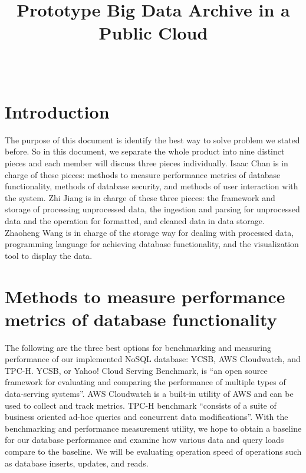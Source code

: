 \documentclass[10pt,draftclsnofoot,onecolumn,journal,compsoc]{IEEEtran}
\title{Prototype Big Data Archive in a Public Cloud}
\author{
  \IEEEauthorblockN{Group 56: Pathfinder of Big Data\\Zhi Jiang, Isaac T Chan, Zhaoheng Wang} \\
  \IEEEauthorblockA{CS 461: Senior Capstone Fall 2016 \\ Oregon State University}
}
\date{}
\begin{document}
    \maketitle
    \IEEEdisplaynontitleabstractindextext
    \IEEEpeerreviewmaketitle

    \newpage
    \tableofcontents
    \newpage
        \section{Introduction}
        The purpose of this document is identify the best way to solve problem we stated before. So in this document, we separate the whole product into nine distinct pieces and each member will discuss three pieces individually. Isaac Chan is in charge of these pieces: methods to measure performance metrics of database functionality, methods of database security, and methods of user interaction with the system. Zhi Jiang is in charge of these three pieces: the framework and storage of processing unprocessed data, the ingestion and parsing for unprocessed data and the operation for formatted, and cleaned data in data storage. Zhaoheng Wang is in charge of the storage way for dealing with processed data, programming language for achieving database functionality, and the visualization tool to display the data. 

        \section{Methods to measure performance metrics of database functionality}
        The following are the three best options for benchmarking and measuring performance of our implemented NoSQL database: YCSB, AWS Cloudwatch, and TPC-H. YCSB, or Yahoo! Cloud Serving Benchmark, is “an open source framework for evaluating and comparing the performance of multiple types of data-serving systems”\cite{I1}. AWS Cloudwatch is a built-in utility of AWS and can be used to collect and track metrics. TPC-H benchmark “consists of a suite of business oriented ad-hoc queries and concurrent data modifications”\cite{I2}. With the benchmarking and performance measurement utility, we hope to obtain a baseline for our database performance and examine how various data and query loads compare to the baseline. We will be evaluating operation speed of operations such as database inserts, updates, and reads.
        
\end{document}

